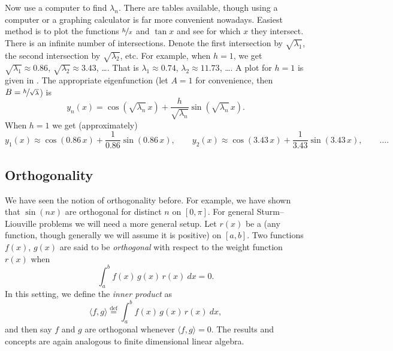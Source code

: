 \begin{example}
Now use a computer to find $\lambda_n$.  There are tables available,
though using a computer or a graphing calculator
is far more convenient nowadays.
Easiest method is to plot the functions 
$\nicefrac{h}{x}$ and $\tan x$ and see for which $x$ they intersect.
There is an infinite number of intersections.  Denote
the first intersection
by $\sqrt{\lambda_1}$,
the second intersection by $\sqrt{\lambda_2}$, etc.
For example, when
$h=1$, we get $\sqrt{\lambda_1} \approx 0.86$, 
$\sqrt{\lambda_2} \approx 3.43$, \ldots.
That is $\lambda_1 \approx 0.74$, $\lambda_2 \approx 11.73$, \ldots.
A plot for $h=1$ is given in .
The appropriate eigenfunction
(let $A = 1$ for convenience, then
$B=\nicefrac{h}{\sqrt{\lambda}}$) is
\begin{equation*}
y_n(x) = \cos ( \sqrt{\lambda_n}\, x ) + \frac{h}{\sqrt{\lambda_n}}
\sin (\sqrt{\lambda_n} \, x ) .
\end{equation*}
When $h=1$ we get (approximately)
\begin{equation*}
y_1(x) \approx \cos (0.86\, x ) + \frac{1}{0.86}
\sin (0.86 \, x ) , \qquad
y_2(x) \approx \cos (3.43\, x ) + \frac{1}{3.43}
\sin (3.43 \, x ) , \qquad \ldots .
\end{equation*}
\begin{myfig}
\capstart
{}
\caption{Plot of $\frac{1}{x}$ and $\tan x$.%
\label{sl:tanx1overxfig}}
\end{myfig}
\end{example}

\subsection{Orthogonality}

We have seen the notion of orthogonality before.  For example,
we have shown that $\sin (nx)$ are orthogonal for distinct $n$ on $[0,\pi]$.
For general Sturm--Liouville problems we will need a more general setup.
Let $r(x)$
be a \emph{} (any function, though generally we will
assume it is positive) on $[a,b]$.  Two functions $f(x)$, $g(x)$
are said to be
\emph{orthogonal} 
with respect to the weight function
$r(x)$ when
\begin{equation*}
\int_a^b f(x) \, g(x) \, r(x) ~dx = 0 .
\end{equation*}
In this setting,
we define the \emph{inner product} as
\begin{equation*}
\langle f , g \rangle \overset{\text{def}}{=} \int_a^b f(x) \, g(x) \, r(x) ~dx ,
\end{equation*}
and then say $f$ and $g$ are orthogonal whenever $\langle f , g \rangle = 0$.
The results and concepts are again analogous to 
finite dimensional linear algebra.

